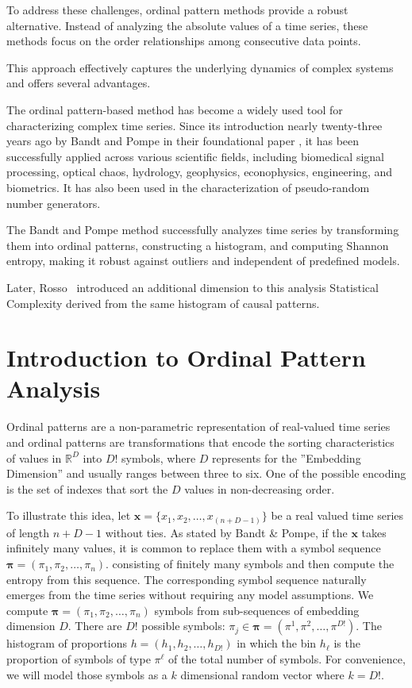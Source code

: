To address these challenges, ordinal pattern methods provide a robust alternative. Instead of analyzing the absolute values of a time series, these methods focus on the order relationships among consecutive data points.

This approach effectively captures the underlying dynamics of complex systems and offers several advantages.

The ordinal pattern-based method has become a widely used tool for characterizing complex time series. Since its introduction nearly twenty-three years ago by Bandt and Pompe in their foundational paper \cite{PhysRevLett.88.174102}, it has been successfully applied across various scientific fields, including biomedical signal processing, optical chaos, hydrology, geophysics, econophysics, engineering, and biometrics. It has also been used in the characterization of pseudo-random number generators.
   
The Bandt and Pompe method successfully analyzes time series by transforming them into ordinal patterns, constructing a histogram, and computing Shannon entropy, making it robust against outliers and independent of predefined models.

Later, Rosso~\cite{Rosso2007} introduced an additional dimension to this analysis Statistical Complexity derived from the same histogram of causal patterns.

\section*{Introduction to Ordinal Pattern Analysis}

Ordinal patterns are a non-parametric representation of real-valued time series and ordinal patterns are transformations that encode the sorting characteristics of values in $\mathbb{R}^D$ into $D!$ symbols, where $D$ represents for the ''Embedding Dimension'' and usually ranges between three to six. 
One of the possible encoding is the set of indexes that sort the $D$ values in non-decreasing order.
 

To illustrate this idea, let $\bm{x}=\{x_1,x_2, \dots, x_{(n+D-1)}\}$ 
be a real valued time series of length $n+D-1$ without ties. 
As stated by Bandt \& Pompe, if the $\bm{x}$ takes infinitely many values, it is common to replace them with a symbol sequence $\bm{{\pi}}=({\pi}_1, {\pi}_2,\dots, {\pi}_n)$.
consisting of finitely many symbols and then compute the entropy from this sequence. 
The corresponding symbol sequence naturally emerges from the time series without requiring any model assumptions. We compute
$\bm{{\pi}}=({\pi}_1, {\pi}_2,\dots, {\pi}_n)$ symbols from sub-sequences of embedding dimension $D$. 
There are $D!$ possible symbols: $\pi_j \in \bm{{\pi}}=({\pi}^1, {\pi}^2,\dots, {\pi}^{D!})$. 
The histogram of proportions $h=(h_1,h_2,\dots, h_{D!})$ in which the bin $h_\ell$ 
is the proportion of symbols of type $\pi^\ell$ of the total number of symbols. 
For convenience, we will model those symbols as a $k$ dimensional random vector where $k=D!$.

